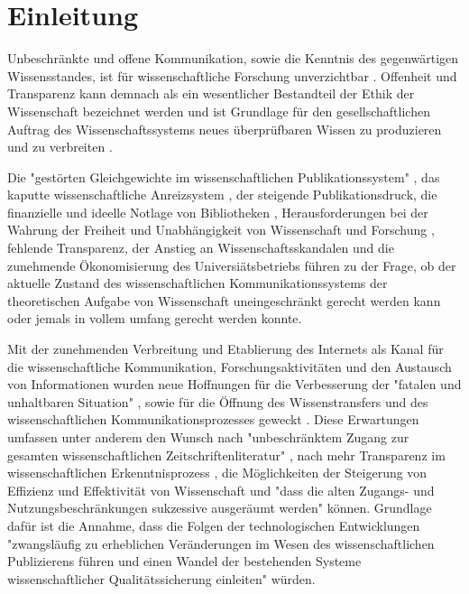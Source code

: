 \chapter{Einleitung}

Unbeschränkte und offene Kommunikation, sowie die Kenntnis des gegenwärtigen Wissensstandes, ist für wissenschaftliche Forschung unverzichtbar \cite{glaeser2006} \cite{gibbons_1994}. Offenheit und Transparenz kann demnach als ein wesentlicher Bestandteil der Ethik der Wissenschaft bezeichnet werden \cite{Peters_2014} \cite{resnik_2005_ethics} und ist Grundlage für den gesellschaftlichen Auftrag des Wissenschaftssystems \cite[:3]{Hanekop_2014} neues überprüfbaren Wissen zu produzieren und zu verbreiten \cite[:551]{Luescher_2014} \cite[:298]{Luhmann1998} \cite[:100]{graefen2007_wissenschaftliche_artikel}.

Die "gestörten Gleichgewichte im wissenschaftlichen Publikationssystem" \cite{cite:0}, das kaputte wissenschaftliche Anreizsystem \cite{osterloh2008anreize}, der steigende Publikationsdruck, die finanzielle und ideelle Notlage von Bibliotheken \cite{russell_2008_business} \cite{Sietmann_oa_2007}, Herausforderungen bei der Wahrung der Freiheit und Unabhängigkeit von Wissenschaft und Forschung \cite{Goetting_2015}, fehlende Transparenz, der Anstieg an Wissenschaftsskandalen \cite{brembs2015open} und die zunehmende Ökonomisierung des Universiätsbetriebs \cite{bauer2006} führen zu der Frage, ob der aktuelle Zustand des wissenschaftlichen Kommunikationssystems der theoretischen Aufgabe von Wissenschaft uneingeschränkt gerecht werden kann \cite{Schekman_2013} oder jemals in vollem umfang gerecht werden konnte.

Mit der zunehmenden Verbreitung und Etablierung des Internets als Kanal für die wissenschaftliche Kommunikation, Forschungsaktivitäten und den Austausch von Informationen wurden neue Hoffnungen für die Verbesserung der "fatalen und unhaltbaren Situation" \cite{brembs2015open}, sowie für die Öffnung des Wissenstransfers \cite{schulze_2013_open} \cite{albert_2006_open_implications} und des wissenschaftlichen Kommunikationsprozesses geweckt \cite{Hanekop_2014} \cite{EuropeanCommission_sciencepub_2006} \cite{Goodrum_2001} \cite{Lawrence_1999}. Diese Erwartungen umfassen unter anderem den Wunsch nach "unbeschränktem Zugang zur gesamten wissenschaftlichen Zeitschriftenliteratur" \cite{boai_2002}, nach mehr Transparenz im wissenschaftlichen Erkenntnisprozess \cite{eu_agenda_open_science_2015}, die Möglichkeiten der Steigerung von Effizienz und Effektivität von Wissenschaft \cite{Partha_1994_economics_science} und "dass die alten Zugangs- und Nutzungsbeschränkungen sukzessive ausgeräumt werden" \cite{boai_2002} können. Grundlage dafür ist die Annahme, dass die Folgen der technologischen Entwicklungen "zwangsläufig zu erheblichen Veränderungen im Wesen des wissenschaftlichen Publizierens führen und einen Wandel der bestehenden Systeme wissenschaftlicher Qualitätssicherung einleiten" \cite{berliner_erklaerung_2003} würden.

